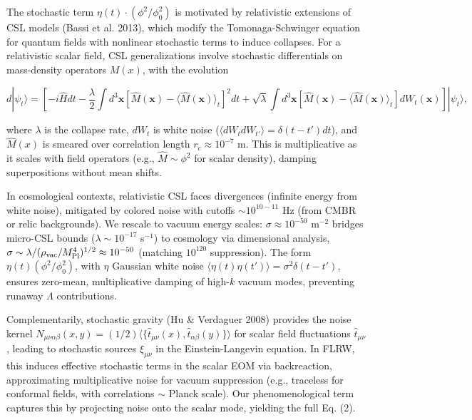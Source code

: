 \documentclass[preprint]{aastex7}
\begin{document}
The stochastic term \( \eta(t) \cdot (\phi^2 / \phi_0^2) \) is motivated by relativistic extensions of CSL models (Bassi et al. 2013), which modify the Tomonaga-Schwinger equation for quantum fields with nonlinear stochastic terms to induce collapses. For a relativistic scalar field, CSL generalizations involve stochastic differentials on mass-density operators \( M(x) \), with the evolution

\begin{equation}
d|\psi_t\rangle = \left[ -i \hat{H} dt - \frac{\lambda}{2} \int d^3\mathbf{x} [\hat{M}(\mathbf{x}) - \langle \hat{M}(\mathbf{x}) \rangle_t]^2 dt + \sqrt{\lambda} \int d^3\mathbf{x} [\hat{M}(\mathbf{x}) - \langle \hat{M}(\mathbf{x}) \rangle_t] dW_t(\mathbf{x}) \right] |\psi_t\rangle,
\end{equation}

where \( \lambda \) is the collapse rate, \( dW_t \) is white noise (\( \langle dW_t dW_{t'}\rangle = \delta(t-t') dt \)), and \( \hat{M}(x) \) is smeared over correlation length \( r_c \approx 10^{-7} \) m. This is multiplicative as it scales with field operators (e.g., \( \hat{M} \sim \phi^2 \) for scalar density), damping superpositions without mean shifts.

In cosmological contexts, relativistic CSL faces divergences (infinite energy from white noise), mitigated by colored noise with cutoffs \( \sim 10^{10-11} \) Hz (from CMBR or relic backgrounds). We rescale to vacuum energy scales: \( \sigma \approx 10^{-50} \) m\( ^{-2} \) bridges micro-CSL bounds (\( \lambda \sim 10^{-17} \) s\( ^{-1} \)) to cosmology via dimensional analysis, \( \sigma \sim \lambda / (\rho_{\rm vac} / M_{\rm Pl}^4)^{1/2} \approx 10^{-50} \) (matching $10^{120}$ suppression). The form \( \eta(t) (\phi^2 / \phi_0^2) \), with \( \eta \) Gaussian white noise \( \langle \eta(t)\eta(t')\rangle = \sigma^2 \delta(t-t') \), ensures zero-mean, multiplicative damping of high-\( k \) vacuum modes, preventing runaway \( \Lambda \) contributions.

Complementarily, stochastic gravity (Hu \& Verdaguer 2008) provides the noise kernel \( N_{\mu\nu\alpha\beta}(x,y) = (1/2) \langle \{ \hat{t}_{\mu\nu}(x), \hat{t}_{\alpha\beta}(y) \} \rangle \) for scalar field fluctuations \( \hat{t}_{\mu\nu} \), leading to stochastic sources \( \xi_{\mu\nu} \) in the Einstein-Langevin equation. In FLRW, this induces effective stochastic terms in the scalar EOM via backreaction, approximating multiplicative noise for vacuum suppression (e.g., traceless for conformal fields, with correlations \( \sim \) Planck scale). Our phenomenological term captures this by projecting noise onto the scalar mode, yielding the full Eq. (2).
\end{document}
